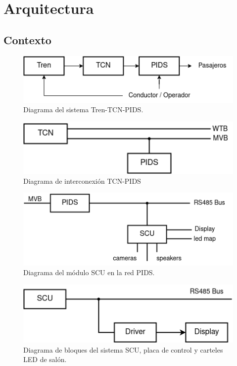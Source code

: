 \pagebreak

\section{Arquitectura}

\subsection{Contexto}
\begin{figure}[ht]
	\centering
	\includegraphics[width=1\textwidth]{./Figures/diagTrenTcnPids.png}
	\caption{Diagrama del sistema Tren-TCN-PIDS.}
	\label{fig:diagTrenTcnPids}
\end{figure}

\begin{figure}[ht]
	\centering
	\includegraphics[width=1\textwidth]{./Figures/diagTcnPidsBusesWtbMvb.png}
	\caption{Diagrama de interconexión TCN-PIDS}
	\label{fig:diagTcnPidsBuusesWtbMvb}
\end{figure}


\begin{figure}[ht]
	\centering
	\includegraphics[width=1\textwidth]{./Figures/diagPidsScuDevices.png}
	\caption{Diagrama del módulo SCU en la red PIDS.}
	\label{fig:diagPidsScuDevices}
\end{figure}

\begin{figure}[ht]
	\centering
	\includegraphics[width=1\textwidth]{./Figures/diagScuDriverDisplay.png}
	\caption{Diagrama de bloques del sistema SCU, placa de control y carteles LED de salón.}
	\label{fig:diagScuDriverDisplay}
\end{figure}

